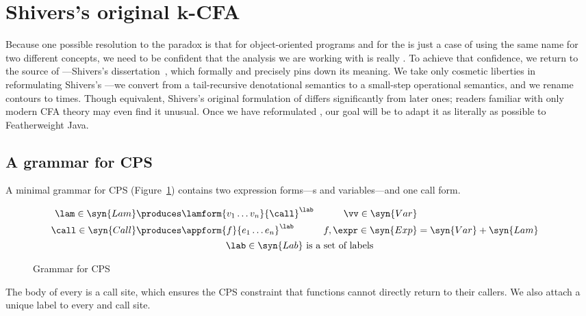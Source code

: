 \section{Shivers's original $\boldsymbol k$-CFA}
\label{sec:kcfa-cps}

Because one possible resolution to the paradox is
that \kCFA{} for object-oriented programs and \kCFA{} for the \lc{} is
just a case of using the same name for two different concepts, we need
to be confident that the analysis we are working with is really
\kCFA.
To achieve that confidence, we return to the source of
\kCFA---Shivers's dissertation~\cite{mattmight:Shivers:1991:CFA},
which formally and precisely pins down its meaning.
We take only cosmetic liberties in reformulating Shivers's \kCFA---we
convert from a tail-recursive denotational semantics to a small-step
operational semantics, and we rename contours to times.
Though equivalent, Shivers's original formulation of \kCFA{} differs
significantly from later ones; readers familiar with only
modern CFA theory may even find it unusual.
Once we have reformulated \kCFA, our goal will be to adapt it as
literally as possible to Featherweight Java.





\subsection{A grammar for CPS}

A minimal grammar for CPS (Figure~\ref{fig:cps-grammar}) contains two 
expression forms---\lamterm s and variables---and one call form.
\begin{figure}
\begin{small}
\begin{gather*}
\begin{align*}
  \lam \in \syn{Lam} &\produces \lamform{v_1 \ldots v_n}{\call}^\lab
  &
  \vv \in \syn{Var}
  \\  
  \call \in \syn{Call} &\produces \appform{f}{e_1 \ldots e_n}^\lab
  &
  f,\expr \in \syn{Exp} &= \syn{Var} + \syn{Lam}  
\end{align*}
  \\
  \lab \in \syn{Lab} \text{ is a set of labels}
\end{gather*}\end{small}\caption{Grammar for CPS}
\label{fig:cps-grammar}
\end{figure}
The body of every \lamterm{} is a call site, which ensures the CPS
constraint that functions cannot directly return to their callers.
We also attach a unique label to every \lamterm{} and call site.




